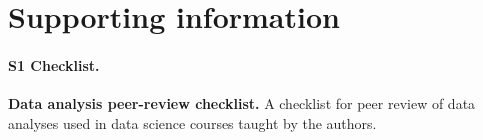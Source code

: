 \newpage
\section*{Supporting information}

\paragraph*{S1 Checklist.}
\label{s1-checklist}
\textbf{Data analysis peer-review checklist.} A checklist for peer review of data analyses used in data science courses taught by the authors.
